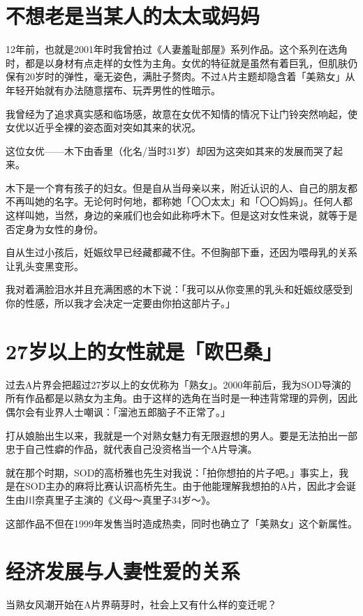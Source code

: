 \documentclass[12pt,UTF8]{ctexbook}
\begin{document}
\section{不想老是当某人的太太或妈妈}

12年前，也就是2001年时我曾拍过《人妻羞耻部屋》系列作品。这个系列在选角时，都是以身材有点走样的女性为主角。女优的特征就是虽然有着巨乳，但肌肤仍保有20岁时的弹性，毫无姿色，满肚子赘肉。不过A片主题却隐含着「美熟女」从年轻开始就有办法随意摆布、玩弄男性的性暗示。

我曾经为了追求真实感和临场感，故意在女优不知情的情况下让门铃突然响起，使女优以近乎全裸的姿态面对突如其来的状况。

这位女优——木下由香里（化名/当时31岁）却因为这突如其来的发展而哭了起来。

木下是一个育有孩子的妇女。但是自从当母亲以来，附近认识的人、自己的朋友都不再叫她的名字。无论何时何地，都称她「〇〇太太」和「〇〇妈妈」。任何人都这样叫她，当然，身边的亲戚们也会如此称呼木下。但是这对女性来说，就等于是否定身为女性的身份。

自从生过小孩后，妊娠纹早已经藏都藏不住。不但胸部下垂，还因为喂母乳的关系让乳头变黑变形。

我对着满脸泪水并且充满困惑的木下说：「我可以从你变黑的乳头和妊娠纹感受到你的性感，所以我才会决定一定要由你拍这部片子。」

\section{27岁以上的女性就是「欧巴桑」}

过去A片界会把超过27岁以上的女优称为「熟女」。2000年前后，我为SOD导演的所有作品都是以熟女为主角。由于这样的选角在当时是一种违背常理的异例，因此偶尔会有业界人士嘲讽：「溜池五郎脑子不正常了。」

打从娘胎出生以来，我就是一个对熟女魅力有无限遐想的男人。要是无法拍出一部忠于自己性癖的作品，就代表自己没资格当一个A片导演。

就在那个时期，SOD的高桥雅也先生对我说：「拍你想拍的片子吧。」事实上，我是在SOD主办的麻将比赛认识高桥先生。由于他能理解我想拍的A片，因此才会诞生由川奈真里子主演的《义母～真里子34岁～》。

这部作品不但在1999年发售当时造成热卖，同时也确立了「美熟女」这个新属性。

\section{经济发展与人妻性爱的关系}

当熟女风潮开始在A片界萌芽时，社会上又有什么样的变迁呢？
\end{document}

